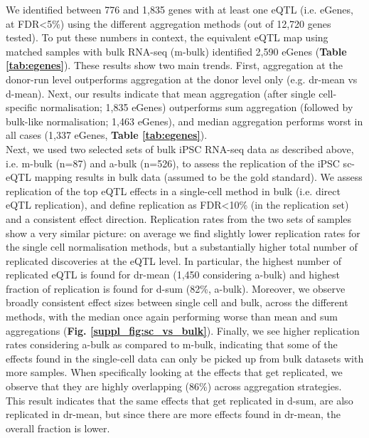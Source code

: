 We identified between 776 and 1,835 genes with at least one eQTL (i.e. eGenes, at FDR<5\%) using the different aggregation methods (out of 12,720 genes tested). 
To put these numbers in context, the equivalent eQTL map using matched samples with bulk RNA-seq (m-bulk) identified 2,590 eGenes (\textbf{Table \ref{tab:egenes}}). 
These results show two main trends. 
First, aggregation at the donor-run level outperforms aggregation at the donor level only (e.g. dr-mean vs d-mean). 
Next, our results indicate that mean aggregation (after single cell-specific normalisation; 1,835 eGenes) outperforms sum aggregation (followed by bulk-like normalisation; 1,463 eGenes), and median aggregation performs worst in all cases (1,337 eGenes, \textbf{Table \ref{tab:egenes}}). \\

Next, we used two selected sets of bulk iPSC RNA-seq data as described above, i.e. m-bulk (n=87) and a-bulk (n=526), to assess the replication of the iPSC sc-eQTL mapping results in bulk data (assumed to be the gold standard). 
We assess replication of the top eQTL effects in a single-cell method in bulk (i.e. direct eQTL replication), and define replication as FDR<10\% (in the replication set) and a consistent effect direction. 
Replication rates from the two sets of samples show a very similar picture: on average we find slightly lower replication rates for the single cell normalisation methods, but a substantially higher total number of replicated discoveries at the eQTL level. 
In particular, the highest number of replicated eQTL is found for dr-mean (1,450 considering a-bulk) and highest fraction of replication is found for d-sum (82\%, a-bulk).
Moreover, we observe broadly consistent effect sizes between single cell and bulk, across the different methods, with the median once again performing worse than mean and sum aggregations (\textbf{Fig. \ref{suppl_fig:sc_vs_bulk}}).
Finally, we see higher replication rates considering a-bulk as compared to m-bulk, indicating that some of the effects found in the single-cell data can only be picked up from bulk datasets with more samples.
When specifically looking at the effects that get replicated, we observe that they are highly overlapping (86\%) across aggregation strategies. 
This result indicates that the same effects that get replicated in d-sum, are also replicated in dr-mean, but since there are more effects found in dr-mean, the overall fraction is lower. \\

